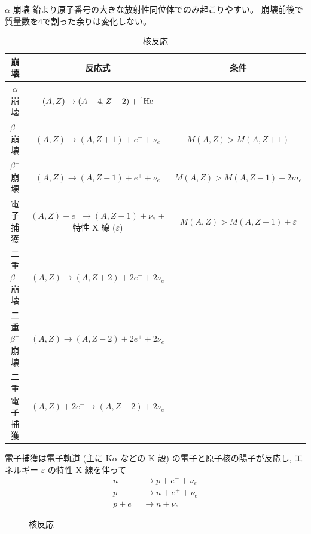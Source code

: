 \documentclass[uplatex,dvipdfmx,a4paper,11pt]{jlreq}
\numberwithin{equation}{section}
\theoremstyle{definition}
\begin{document}
$\alpha$ 崩壊
鉛より原子番号の大きな放射性同位体でのみ起こりやすい。
崩壊前後で質量数を4で割った余りは変化しない。
\begin{table}[hbtp]
  \centering
  \begin{tabular}{|c|c|c|}
    \hline
    崩壊              & 反応式                                                            & 条件                                    \\
    \hline \hline
    $\alpha$ 崩壊     & $(A, Z) \to (A - 4, Z - 2) + \ce{^4He}$                        &                                       \\
    $\beta^-$ 崩壊    & $(A, Z) \to (A, Z + 1) + e^- + \overline{\nu}_e$               & $M(A, Z) > M(A, Z + 1)$               \\
    $\beta^+$ 崩壊    & $(A, Z) \to (A, Z - 1) + e^+ + \nu_e$                          & $M(A, Z) > M(A, Z - 1) + 2m_e$        \\
    電子捕獲            & $(A, Z) + e^- \to (A, Z - 1) + \nu_e$ + 特性 X 線 ($\varepsilon$) & $M(A, Z) > M(A, Z - 1) + \varepsilon$ \\
    二重 $\beta^-$ 崩壊 & $(A, Z) \to (A, Z + 2) + 2e^- + 2\overline{\nu}_e$             &                                       \\
    二重 $\beta^+$ 崩壊 & $(A, Z) \to (A, Z - 2) + 2e^+ + 2\nu_e$                        &                                       \\
    二重電子捕獲          & $(A, Z) + 2e^- \to (A, Z - 2) + 2\nu_e$                        &                                       \\
    \hline
  \end{tabular}
  \caption{核反応}
  \label{table:kernel}
\end{table}
電子捕獲は電子軌道 (主に K$\alpha$ などの K 殻) の電子と原子核の陽子が反応し, エネルギー $\varepsilon$ の特性 X 線を伴って
\begin{align}
  n       & \to p + e^- + \overline{\nu}_e \\
  p       & \to n + e^+ + \nu_e            \\
  p + e^- & \to n + \nu_e
\end{align}
\begin{figure}[htpb]
  \centering
  \caption{核反応}
\end{figure}
\end{document}
